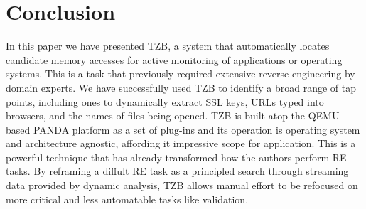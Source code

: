 \section{Conclusion}
\label{sec:conclusion}

In this paper we have presented TZB, a system that automatically locates
candidate memory accesses for active monitoring of applications or operating
systems. This is a task that previously required extensive reverse engineering
by domain experts. We have successfully used TZB to identify a broad range of
tap points, including ones to dynamically extract SSL keys, URLs typed into
browsers, and the names of files being opened. TZB is built atop the QEMU-based
PANDA platform as a set of plug-ins and its operation is operating system and
architecture agnostic, affording it impressive scope for application. This is a
powerful technique that has already transformed how the authors perform RE
tasks. By reframing a diffult RE task as a principled search through streaming
data provided by dynamic analysis, TZB allows manual effort to be refocused on
more critical and less automatable tasks like validation.

\hfill
